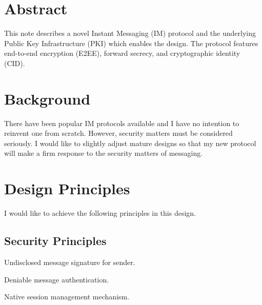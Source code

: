 \documentclass[a4paper,11pt]{article}
\begin{document}
\fulldoctitle



\section*{Abstract}

This note describes a novel Instant Messaging (IM) protocol and the underlying Public Key Infrastructure (PKI) which enables the design.
The protocol features end-to-end encryption (E2EE), forward secrecy, and cryptographic identity (CID).



\Nmaketoc













\section{Background}

There have been popular IM protocols available and I have no intention to reinvent one from scratch.
However, security matters must be considered seriously.
I would like to slightly adjust mature designs so that my new protocol will make a firm response to the security matters of messaging.










\section{Design Principles}

I would like to achieve the following principles in this design.

\subsection{Security Principles}

\begin{compactitem}
	\item Undisclosed message signature for sender.
	\item Deniable message authentication.
	\item Native session management mechanism.
\end{compactitem}
\end{document}
